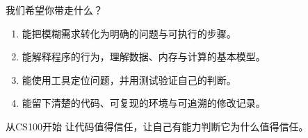 \begin{frame}{我们希望你带走什么？}
    \begin{enumerate}
        \item 能把模糊需求转化为明确的问题与可执行的步骤。
        \item 能解释程序的行为，理解数据、内存与计算的基本模型。
        \item 能使用工具定位问题，并用测试验证自己的判断。
        \item 能留下清楚的代码、可复现的环境与可追溯的修改记录。
    \end{enumerate}
    \begin{vspquote}{从CS100开始}
        让代码值得信任，让自己有能力判断它为什么值得信任。
    \end{vspquote}
\end{frame}
